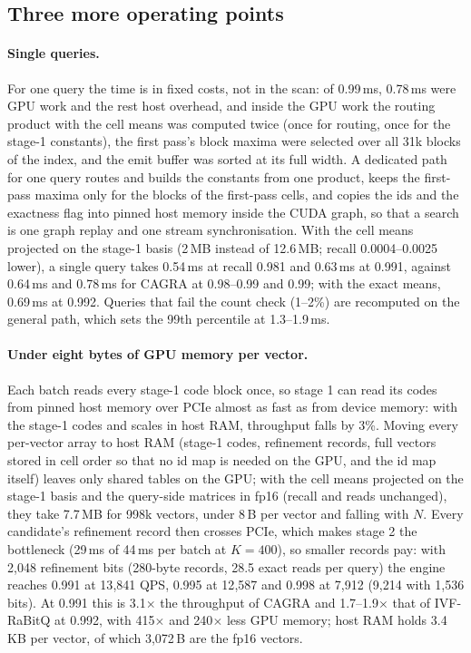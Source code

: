 \documentclass[fleqn,10pt]{wlscirep}
\begin{document}
\subsection{Three more operating points}\label{sec:points}
\paragraph{Single queries.} For one query the time is in fixed costs, not in the scan: of 0.99\,ms, 0.78\,ms were GPU work and the rest host overhead, and inside the GPU work the routing product with the cell means was computed twice (once for routing, once for the stage-1 constants), the first pass's block maxima were selected over all 31k blocks of the index, and the emit buffer was sorted at its full width. A dedicated path for one query routes and builds the constants from one product, keeps the first-pass maxima only for the blocks of the first-pass cells, and copies the ids and the exactness flag into pinned host memory inside the CUDA graph, so that a search is one graph replay and one stream synchronisation. With the cell means projected on the stage-1 basis (2\,MB instead of 12.6\,MB; recall 0.0004--0.0025 lower), a single query takes 0.54\,ms at recall 0.981 and 0.63\,ms at 0.991, against 0.64\,ms and 0.78\,ms for CAGRA at 0.98--0.99 and 0.99; with the exact means, 0.69\,ms at 0.992. Queries that fail the count check (1--2\%) are recomputed on the general path, which sets the 99th percentile at 1.3--1.9\,ms.

\paragraph{Under eight bytes of GPU memory per vector.} Each batch reads every stage-1 code block once, so stage 1 can read its codes from pinned host memory over PCIe almost as fast as from device memory: with the stage-1 codes and scales in host RAM, throughput falls by 3\%. Moving every per-vector array to host RAM (stage-1 codes, refinement records, full vectors stored in cell order so that no id map is needed on the GPU, and the id map itself) leaves only shared tables on the GPU; with the cell means projected on the stage-1 basis and the query-side matrices in fp16 (recall and reads unchanged), they take 7.7\,MB for 998k vectors, under 8\,B per vector and falling with $N$. Every candidate's refinement record then crosses PCIe, which makes stage 2 the bottleneck (29\,ms of 44\,ms per batch at $K=400$), so smaller records pay: with 2{,}048 refinement bits (280-byte records, 28.5 exact reads per query) the engine reaches 0.991 at 13{,}841 QPS, 0.995 at 12{,}587 and 0.998 at 7{,}912 (9{,}214 with 1{,}536 bits). At 0.991 this is 3.1$\times$ the throughput of CAGRA and 1.7--1.9$\times$ that of IVF-RaBitQ at 0.992, with 415$\times$ and 240$\times$ less GPU memory; host RAM holds 3.4\,KB per vector, of which 3{,}072\,B are the fp16 vectors.
\end{document}
